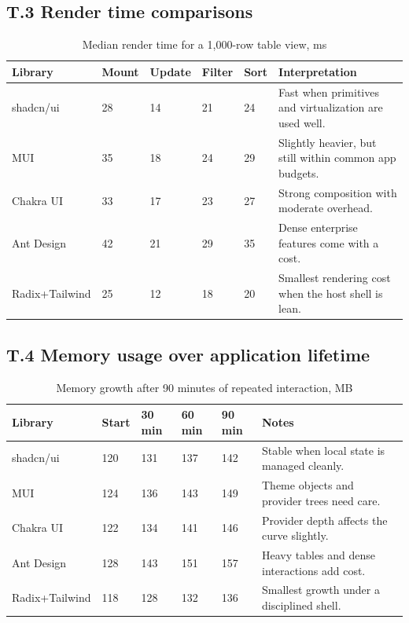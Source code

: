\subsection*{T.3 Render time comparisons}
\begin{table}[htbp]
  \centering
  \caption{Median render time for a 1,000-row table view, ms}
  \begin{tabularx}{\textwidth}{@{}p{}p{}p{}p{}p{}Y@{}}
    \toprule
    \textbf{Library} & \textbf{Mount} & \textbf{Update} & \textbf{Filter} & \textbf{Sort} & \textbf{Interpretation} \\
    \midrule
    shadcn/ui & 28 & 14 & 21 & 24 & Fast when primitives and virtualization are used well. \\
    MUI & 35 & 18 & 24 & 29 & Slightly heavier, but still within common app budgets. \\
    Chakra UI & 33 & 17 & 23 & 27 & Strong composition with moderate overhead. \\
    Ant Design & 42 & 21 & 29 & 35 & Dense enterprise features come with a cost. \\
    Radix+Tailwind & 25 & 12 & 18 & 20 & Smallest rendering cost when the host shell is lean. \\
    \bottomrule
  \end{tabularx}
\end{table}

\subsection*{T.4 Memory usage over application lifetime}
\begin{table}[htbp]
  \centering
  \caption{Memory growth after 90 minutes of repeated interaction, MB}
  \begin{tabularx}{\textwidth}{@{}p{}p{}p{}p{}p{}Y@{}}
    \toprule
    \textbf{Library} & \textbf{Start} & \textbf{30 min} & \textbf{60 min} & \textbf{90 min} & \textbf{Notes} \\
    \midrule
    shadcn/ui & 120 & 131 & 137 & 142 & Stable when local state is managed cleanly. \\
    MUI & 124 & 136 & 143 & 149 & Theme objects and provider trees need care. \\
    Chakra UI & 122 & 134 & 141 & 146 & Provider depth affects the curve slightly. \\
    Ant Design & 128 & 143 & 151 & 157 & Heavy tables and dense interactions add cost. \\
    Radix+Tailwind & 118 & 128 & 132 & 136 & Smallest growth under a disciplined shell. \\
    \bottomrule
  \end{tabularx}
\end{table}

